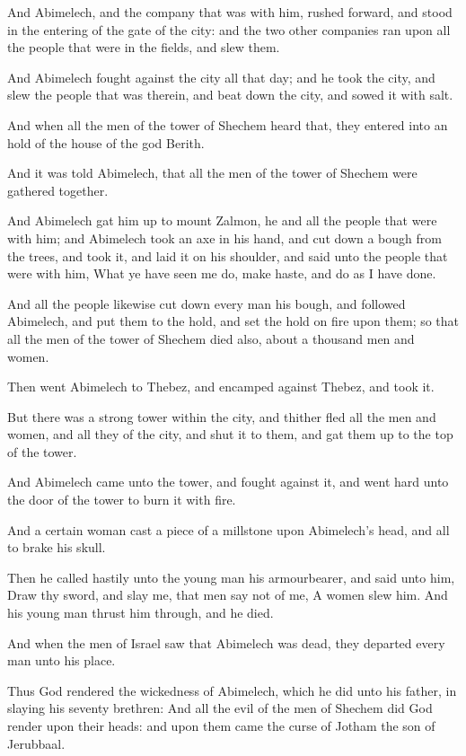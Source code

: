 \Verse And Abimelech, and the company that was with him, rushed forward, and stood in the entering of the gate of the city: and the two other companies ran upon all the people that were in the fields, and slew them.

\Verse And Abimelech fought against the city all that day; and he took the city, and slew the people that was therein, and beat down the city, and sowed it with salt.

\Verse And when all the men of the tower of Shechem heard that, they entered into an hold of the house of the god Berith.

\Verse And it was told Abimelech, that all the men of the tower of Shechem were gathered together.

\Verse And Abimelech gat him up to mount Zalmon, he and all the people that were with him; and Abimelech took an axe in his hand, and cut down a bough from the trees, and took it, and laid it on his shoulder, and said unto the people that were with him, What ye have seen me do, make haste, and do as I have done.

\Verse And all the people likewise cut down every man his bough, and followed Abimelech, and put them to the hold, and set the hold on fire upon them; so that all the men of the tower of Shechem died also, about a thousand men and women.

\Verse Then went Abimelech to Thebez, and encamped against Thebez, and took it.

\Verse But there was a strong tower within the city, and thither fled all the men and women, and all they of the city, and shut it to them, and gat them up to the top of the tower.

\Verse And Abimelech came unto the tower, and fought against it, and went hard unto the door of the tower to burn it with fire.

\Verse And a certain woman cast a piece of a millstone upon Abimelech's head, and all to brake his skull.

\Verse Then he called hastily unto the young man his armourbearer, and said unto him, Draw thy sword, and slay me, that men say not of me, A women slew him. And his young man thrust him through, and he died.

\Verse And when the men of Israel saw that Abimelech was dead, they departed every man unto his place.

\Verse Thus God rendered the wickedness of Abimelech, which he did unto his father, in slaying his seventy brethren: \Verse And all the evil of the men of Shechem did God render upon their heads: and upon them came the curse of Jotham the son of Jerubbaal.


